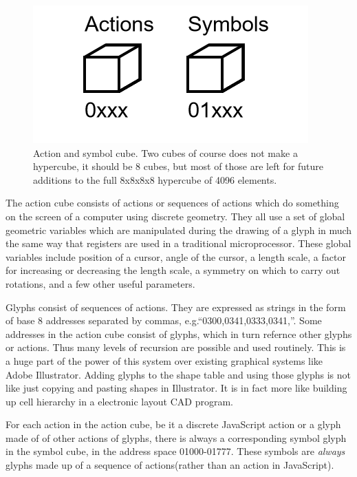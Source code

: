 \documentclass[11pt]{article}
\begin{document}
\begin{figure}

\includegraphics[width=\linewidth]{figures/figure1_cubes.png}

\caption{Action and symbol cube. Two cubes of course does not make a hypercube, it should be 8 cubes, but most of those are left for future additions to the full 8x8x8x8 hypercube of 4096 elements.}
\end{figure}




    The action cube consists of actions or sequences of actions which do something on the screen of a computer using discrete geometry.  They all use a set of global geometric variables which are manipulated during the drawing of a glyph in much the same way that registers are used in a traditional microprocessor.  These global variables include position of a cursor, angle of the cursor, a length scale, a factor for increasing or decreasing the length scale, a symmetry on which to carry out rotations, and a few other useful parameters.   





    Glyphs consist of sequences of actions.  They are expressed as strings in the form of base 8 addresses separated by commas, e.g.``0300,0341,0333,0341,''.  Some addresses in the action cube consist of glyphs, which in turn refernce other glyphs or actions.  Thus many levels of recursion are possible and used routinely.  This is a huge part of the power of this system over existing graphical systems like Adobe Illustrator.  Adding glyphs to the shape table and using those glyphs is not like just copying and pasting shapes in Illustrator.  It is in fact more like building up cell hierarchy in a electronic layout CAD program. 
    



    For each action in the action cube, be it a discrete JavaScript action or a glyph made of of other actions of glyphs, there is always a corresponding symbol glyph in the symbol cube, in the address space 01000-01777.  These symbols are \textit{
always} glyphs made up of a sequence of actions(rather than an action in JavaScript).  
\end{document}
